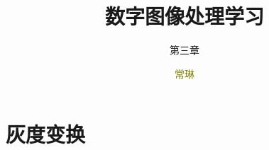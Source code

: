 \documentclass[notheorems,serif,table,compress]{beamer}  %
\begin{document}
\title{数字图像处理学习}
\subtitle{第三章}
\author[]{\textcolor{olive}{常琳}}
\frame{ \titlepage }
\def\hilite<#1>{\temporal<#1>{\color{blue!15}}{\color{black}}{\color{black}}}
\newcommand{\shadow}[2][purple]{\hskip5pt\shadowbox{\color{#1}\small \kai #2\vspace{3mm}}}
\newcommand{\colorrbox}[2][purple]{\doublebox{\color{#1}\small \kai#2}}


\section{灰度变换}
\end{document}
